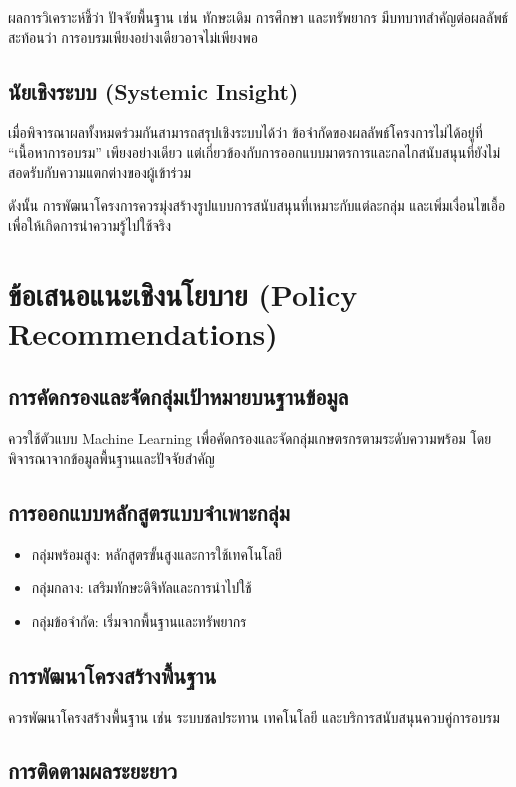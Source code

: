 ผลการวิเคราะห์ชี้ว่า ปัจจัยพื้นฐาน เช่น ทักษะเดิม การศึกษา และทรัพยากร มีบทบาทสำคัญต่อผลลัพธ์ สะท้อนว่า การอบรมเพียงอย่างเดียวอาจไม่เพียงพอ

\subsection{นัยเชิงระบบ (Systemic Insight)}

เมื่อพิจารณาผลทั้งหมดร่วมกันสามารถสรุปเชิงระบบได้ว่า ข้อจำกัดของผลลัพธ์โครงการไม่ได้อยู่ที่ “เนื้อหาการอบรม” เพียงอย่างเดียว แต่เกี่ยวข้องกับการออกแบบมาตรการและกลไกสนับสนุนที่ยังไม่สอดรับกับความแตกต่างของผู้เข้าร่วม

ดังนั้น การพัฒนาโครงการควรมุ่งสร้างรูปแบบการสนับสนุนที่เหมาะกับแต่ละกลุ่ม และเพิ่มเงื่อนไขเอื้อเพื่อให้เกิดการนำความรู้ไปใช้จริง

\section{ข้อเสนอแนะเชิงนโยบาย (Policy Recommendations)}

\subsection{การคัดกรองและจัดกลุ่มเป้าหมายบนฐานข้อมูล}

ควรใช้ตัวแบบ Machine Learning เพื่อคัดกรองและจัดกลุ่มเกษตรกรตามระดับความพร้อม โดยพิจารณาจากข้อมูลพื้นฐานและปัจจัยสำคัญ

\subsection{การออกแบบหลักสูตรแบบจำเพาะกลุ่ม}

\begin{itemize}
\item กลุ่มพร้อมสูง: หลักสูตรขั้นสูงและการใช้เทคโนโลยี
\item กลุ่มกลาง: เสริมทักษะดิจิทัลและการนำไปใช้
\item กลุ่มข้อจำกัด: เริ่มจากพื้นฐานและทรัพยากร
\end{itemize}

\subsection{การพัฒนาโครงสร้างพื้นฐาน}

ควรพัฒนาโครงสร้างพื้นฐาน เช่น ระบบชลประทาน เทคโนโลยี และบริการสนับสนุนควบคู่การอบรม

\subsection{การติดตามผลระยะยาว}

